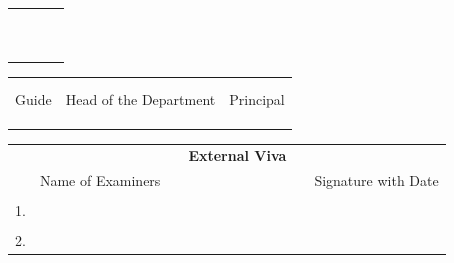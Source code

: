 \ifIDP
\begin{table}[H]
\centering
\begin{tabular}{p{}p{}p{}c}
	&&&\\
	&&&\\
	\centering{\printGuideNameA} & &\centering{\printHOD} &\\
	\centering{Guide} & & \centering{Head of the Department}& \\
	& & &\\
	& & & \\
	& & & \\
	\centering{\printDA} &  & \centering{\printPrincipal} &\\
	\centering{Dean Academics} & & \centering{Principal} &\\
	&&&\\
\end{tabular}%
\end{table}
\else
\vspace{1cm}
\begin{table}[H]
\centering
\begin{tabular}{p{}p{}p{}}
	& &\\
	& &\\
	\centering Guide &\centering Head of the Department &\centering Principal\tabularnewline
	& &\\
	\centering\printGuideNameA & \centering\printHOD & \centering\printPrincipal\tabularnewline
	& & \\
\end{tabular}
\end{table}
\fi %
\ifStuNameCUsed \vspace{-0.75cm}\fi
\begin{table}[H]
\centering
\begin{tabular}{lccp{6cm}cc}
	&&&\textbf{\Large External Viva}&&\\
	
	&Name of Examiners &&& & Signature with Date\\
	&&&&&\\
	1.&&&&&\\
	&&&&&\\
	2.&&&&&\\
\end{tabular}%
\end{table}
